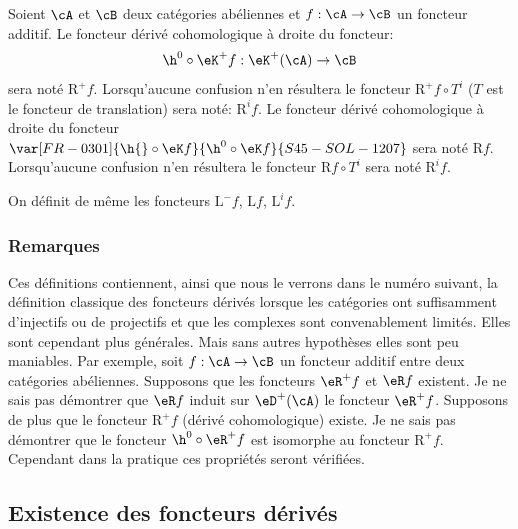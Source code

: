 Soient $\cA$ et $\cB$ deux catégories abéliennes et $f:\cA\to \cB$ un 
foncteur additif. Le foncteur dérivé cohomologique à droite du foncteur: 
\[
  \h^0{}\circ \eK^+ f:\eK^+(\cA) \to \cB 
\]
sera noté $\mathrm{R}^+ f$. Lorsqu'aucune confusion n'en résultera le foncteur 
$\mathrm{R}^+ f\circ T^i$ ($T$ est le foncteur de translation) sera noté: 
$\mathrm{R}^i f$. Le foncteur dérivé cohomologique à droite du foncteur 
$\var[FR-0301]{\h{}\circ \eK f}{\h^0{}\circ \eK f}{S45-SOL-1207}$ sera noté $\mathrm{R} f$. Lorsqu'aucune confusion n'en résultera 
le foncteur $\mathrm{R} f\circ T^i$ sera noté $\mathrm{R}^i f$. 

On définit de même les foncteurs $\mathrm{L}^- f$, $\mathrm{L} f$, $\mathrm{L}^i f$. 





\subsubsection{Remarques}\label{VIII:4-1-6}

Ces définitions contiennent, ainsi que nous le verrons dans le numéro 
suivant, la définition classique des foncteurs dérivés lorsque les 
catégories ont suffisamment d'injectifs ou de projectifs et que les complexes 
sont convenablement limités. Elles sont cependant plus générales. Mais 
sans autres hypothèses elles sont peu maniables. Par exemple, soit 
$f:\cA\to \cB$ un foncteur additif entre deux catégories abéliennes. 
Supposons que les foncteurs $\eR^+ f$ et $\eR f$ existent. Je ne sais pas 
démontrer que $\eR f$ induit sur $\eD^+(\cA)$ le foncteur $\eR^+ f$. Supposons 
de plus que le foncteur $\mathrm{R}^+ f$ (dérivé cohomologique) existe. Je ne sais 
pas démontrer que le foncteur $\h^0{}\circ \eR^+ f$ est isomorphe au foncteur 
$\mathrm{R}^+ f$. Cependant dans la pratique ces propriétés seront vérifiées. 










\subsection{Existence des foncteurs dérivés}\label{VIII:4-2}





